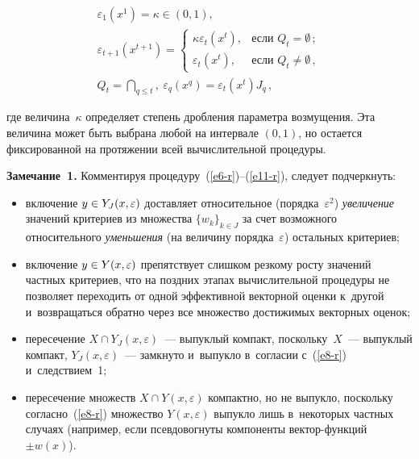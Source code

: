 \begin{multicols}{2}
\vspace*{-4pt}

\noindent
\begin{multline}
\varepsilon_1\left(x^1\right) =\kappa\in (0,1),\\
\varepsilon_{t+1}\left(x^{t+1}\right) =\begin{cases}
\kappa \varepsilon_t(x^t), &\mbox{если } Q_t=\emptyset\,;\\
\varepsilon_t(x^t), &\mbox{если } Q_t\not= \emptyset\,,
\end{cases}\\
Q_t=\bigcap\limits_{q\leq t},\ \varepsilon_q(x^q)=\varepsilon_t(x^t)J_q\,,
\label{e11-r}
\end{multline}

\vspace*{-4pt}

\noindent
где величина~$\kappa$ определяет степень дробления параметра 
возмущения. Эта величина может быть выбрана любой на интервале $(0,1)$, 
но остается фиксированной на протяжении всей вычислительной процедуры.

\smallskip

\noindent
\textbf{Замечание~1.} Комментируя процедуру~(\ref{e6-r})--(\ref{e11-r}), 
следует подчеркнуть:
\begin{itemize}
\item включение $y\hm\in Y_J(x,\varepsilon)$ доставляет относительное 
(порядка~$\varepsilon^2$) \textit{увеличение} значений критериев из 
множества $\{ w_k\}_{k\in J}$ за счет возможного относительного 
\textit{уменьшения} (на величину порядка~$\varepsilon$) остальных 
критериев;
\item включение $y\hm\in Y(x,\varepsilon)$ препятствует слишком резкому 
росту значений частных критериев, что на поздних этапах вычислительной 
процедуры не позволяет переходить от одной эффективной векторной оценки 
к~другой и~возвращаться обратно через все множество достижимых 
векторных оценок;
\item пересечение $X\cap Y_J (x,\varepsilon)$~--- выпуклый компакт, 
поскольку~$X$~--- выпуклый компакт, $ Y_J(x,\varepsilon)$~--- замкнуто 
и~выпукло в~согласии с~(\ref{e8-r}) и~следствием~1;
\item пересечение множеств $X\cap Y(x,\varepsilon)$ компактно, но не 
выпукло, поскольку согласно~(\ref{e8-r}) множество $ Y(x,\varepsilon)$ 
выпукло лишь в~некоторых частных случаях (например, если псевдовогнуты 
компоненты век\-тор-функ\-ций $\pm w(x)$).
\end{itemize}
  

\end{multicols}
